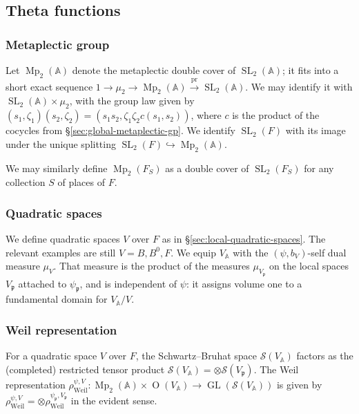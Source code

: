 \documentclass[reqno,10pt]{amsart}
\theoremstyle{plain} %
\theoremstyle{definition}
\theoremstyle{plain} %
\theoremstyle{remark}
\theoremstyle{itplain} %
\theoremstyle{remark} %
\numberwithin{equation}{section}
\DeclareMathOperator{\SL}{SL}
\DeclareMathOperator{\Mp}{Mp}
\DeclareMathOperator{\GL}{GL}
\DeclareMathOperator{\Weil}{Weil}
\def\O{\operatorname{O}}
\DeclareMathOperator{\pr}{pr}
\begin{document}
\subsection{Theta functions}
\label{sec-3-2}
\subsubsection{Metaplectic group\label{sec:global-metaplectic-gp}}
\label{sec-3-2-1}
Let $\Mp_2(\mathbb{A})$ denote the metaplectic double cover of $\SL_2(\mathbb{A})$; it fits into a short exact sequence $1 \rightarrow \mu_2 \rightarrow \Mp_2(\mathbb{A}) \xrightarrow{\pr} \SL_2(\mathbb{A})$.  We may identify it with $\SL_2(\mathbb{A}) \times \mu_2$, with the group law given by $(s_1,\zeta_1) (s_2,\zeta_2) = (s_1 s_2, \zeta_1 \zeta_2 c(s_1,s_2))$, where $c$ is the product of the cocycles from \S\ref{sec:global-metaplectic-gp}.  We identify $\SL_2(F)$ with its image under the unique splitting $\SL_2(F) \hookrightarrow \Mp_2(\mathbb{A})$.

We may similarly define $\Mp_2(F_S)$ as a double cover of $\SL_2(F_S)$ for any collection $S$ of places of $F$.
\subsubsection{Quadratic spaces}
\label{sec-3-2-2}
We define quadratic spaces $V$ over $F$ as in \S\ref{sec:local-quadratic-spaces}.  The relevant examples are still $V = B, B^0, F$.  We equip $V_\mathbb{A}$ with the $(\psi,b_V)$-self dual measure $\mu_V$.  That measure is the product of the measures $\mu_{V_\mathfrak{p}}$ on the local spaces $V_{\mathfrak{p}}$ attached to $\psi_\mathfrak{p}$, and is independent of $\psi$: it assigns volume one to a fundamental domain for $V_\mathbb{A}/V$.


\subsubsection{Weil representation\label{sec:weil-repn-global}}
\label{sec-3-2-3}
For a quadratic space $V$ over $F$, the Schwartz--Bruhat space $\mathcal{S}(V_\mathbb{A})$ factors as the (completed) restricted tensor product $\mathcal{S}(V_\mathbb{A}) = \otimes \mathcal{S}(V_\mathfrak{p})$.  The Weil representation $\rho_{\Weil}^{\psi,V} : \Mp_2(\mathbb{A}) \times \O(V_\mathbb{A}) \rightarrow \GL(\mathcal{S}(V_\mathbb{A}))$ is given by $\rho_{\Weil}^{\psi,V} = \otimes \rho_{\Weil}^{\psi_{\mathfrak{p}},V_{\mathfrak{p}}}$ in the evident sense.
\end{document}

